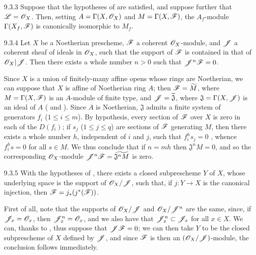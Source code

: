 \begin{envs}[Corollary]{9.3.3}
\label{cor-1.9.3.3}
Suppose that the hypotheses of  are satisfied, and suppose further that
$\mathscr{L}=\mathscr{O}_X$. Then, setting $A=\Gamma(X,\mathscr{O}_X)$ and $M=\Gamma(X,\mathscr{F})$, the $A_f$-module
$\Gamma(X_f,\mathscr{F})$ is canonically isomorphic to $M_f$.
\end{envs}

\begin{envs}[Proposition]{9.3.4}
\label{prop-1.9.3.4}
Let $X$ be a Noetherian prescheme, $\mathscr{F}$ a coherent $\mathscr{O}_X$-module, and $\mathscr{J}$ a
coherent sheaf of ideals in $\mathscr{O}_X$, such that the support of $\mathscr{F}$ is contained in that
of $\mathscr{O}_X|\mathscr{J}$. Then there exists a whole number $n>0$ such that $\mathscr{J}^n\mathscr{F}=0$.
\end{envs}

Since $X$ is a union of finitely-many affine opens whose rings are Noetherian, we can suppose
that $X$ is affine of Noetherian ring $A$; then $\mathscr{F}=\widetilde{M}$, where
$M=\Gamma(X,\mathscr{F})$ is an $A$-module of finite type, and $\mathscr{J}=\widetilde{\mathfrak{J}}$,
where $\mathfrak{J}=\Gamma(X,\mathscr{J})$ is an ideal of $A$ ( and
). Since $A$ is Noetherian, $\mathfrak{J}$ admits a finite system of
generators $f_i$ ($1\leqslant i\leqslant m$). By hypothesis, every section of $\mathscr{F}$ over
$X$ is zero in each of the $D(f_i)$; if $s_j$ ($1\leqslant j\leqslant q$) are sections of
$\mathscr{F}$ generating $M$, then there exists a whole number $h$, independent of $i$ and $j$,
such that $f_i^h s_j=0$ , whence $f_i^h s=0$ for all $s\in M$. We thus
conclude that if $n=mh$ then $\mathfrak{J}^n M=0$, and so the corresponding $\mathscr{O}_X$-module
$\mathscr{J}^n\mathscr{F}=\widetilde{\mathfrak{J}^n M}$  is zero.

\begin{envs}[Corollary]{9.3.5}
\label{cor-1.9.3.5}
With the hypotheses of , there exists a closed subprescheme $Y$ of $X$,
whose underlying space is the support of $\mathscr{O}_X/\mathscr{J}$, such that, if $j:Y\to X$ is the
canonical injection, then $\mathscr{F}=j_*(j^*(\mathscr{F}))$.
\end{envs}

First of all, note that the supports of $\mathscr{O}_X/\mathscr{J}$ and $\mathscr{O}_X/\mathscr{J}^n$ are the same,
since, if $\mathscr{J}_x=\mathscr{O}_x$, then $\mathscr{J}_x^n=\mathscr{O}_x$, and we also have that
$\mathscr{J}_x^n\subset\mathscr{J}_x$ for all $x\in X$. We can, thanks to , thus
suppose that $\mathscr{J}\mathscr{F}=0$; we can then take $Y$ to be the closed subprescheme of $X$
defined by $\mathscr{J}$, and since $\mathscr{F}$ is then an $(\mathscr{O}_X/\mathscr{J})$-module, the conclusion
follows immediately.

